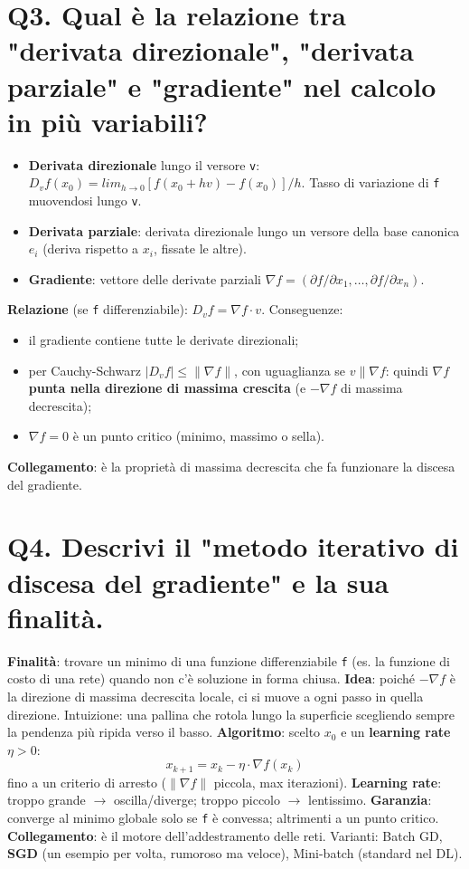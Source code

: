 \documentclass[11pt,a4paper]{article}
\begin{document}
\section*{Q3. Qual è la relazione tra "derivata direzionale", "derivata parziale" e "gradiente" nel calcolo in più variabili?}
\begin{itemize}
\item \textbf{Derivata direzionale} lungo il versore \texttt{v}: $D_{v}f(x_{0}) = lim_{h\to 0} [f(x_{0}+hv) - f(x_{0})]/h$. Tasso di variazione di \texttt{f} muovendosi lungo \texttt{v}.
\item \textbf{Derivata parziale}: derivata direzionale lungo un versore della base canonica $e_{i}$ (deriva rispetto a $x_{i}$, fissate le altre).
\item \textbf{Gradiente}: vettore delle derivate parziali $\nabla f = (\partial f/\partial x_{1}, \dots , \partial f/\partial x_{n})$.
\end{itemize}
\textbf{Relazione} (se \texttt{f} differenziabile): $D_{v}f = \nabla f \cdot  v$. Conseguenze:
\begin{itemize}
\item il gradiente contiene tutte le derivate direzionali;
\item per Cauchy-Schwarz $|D_{v}f| \le  \|\nabla f\|$, con uguaglianza se $v \| \nabla f$: quindi \textbf{$\nabla f$ punta nella direzione di massima crescita} (e $-\nabla f$ di massima decrescita);
\item $\nabla f = 0$ è un punto critico (minimo, massimo o sella).
\end{itemize}
\textbf{Collegamento}: è la proprietà di massima decrescita che fa funzionare la discesa del gradiente.
\newpage
\section*{Q4. Descrivi il "metodo iterativo di discesa del gradiente" e la sua finalità.}
\textbf{Finalità}: trovare un minimo di una funzione differenziabile \texttt{f} (es. la funzione di costo di una rete) quando non c'è soluzione in forma chiusa.
\textbf{Idea}: poiché $-\nabla f$ è la direzione di massima decrescita locale, ci si muove a ogni passo in quella direzione. Intuizione: una pallina che rotola lungo la superficie scegliendo sempre la pendenza più ripida verso il basso.
\textbf{Algoritmo}: scelto $x_{0}$ e un \textbf{learning rate} $\eta  > 0$:
\[ x_{k+1} = x_{k} - \eta  \cdot  \nabla f(x_{k}) \]
fino a un criterio di arresto ($\|\nabla f\|$ piccola, max iterazioni).
\textbf{Learning rate}: troppo grande $\to $ oscilla/diverge; troppo piccolo $\to $ lentissimo. \textbf{Garanzia}: converge al minimo globale solo se \texttt{f} è convessa; altrimenti a un punto critico.
\textbf{Collegamento}: è il motore dell'addestramento delle reti. Varianti: Batch GD, \textbf{SGD} (un esempio per volta, rumoroso ma veloce), Mini-batch (standard nel DL).
\newpage
\end{document}
